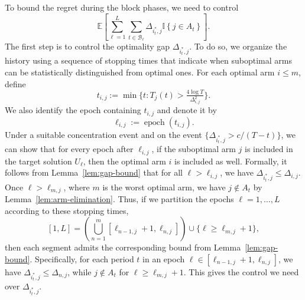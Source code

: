 \documentclass[opre,blindrev]{informs3}
\newcommand{\epoch}{\operatorname{epoch}}
\newcommand{\ind}[1]{\mathbb{I}\left\{#1\right\}}
\newcommand{\bE}[1]{{\mathbb{E}\left[#1\right]}}
\begin{document}
\begin{APPENDICES}
To bound the regret during the block phases, we need to control
\[
    \bE{\sum_{\ell=1}^L \sum_{t\in \mathcal{B}_{\ell}} \Delta_{i_t^*,j} \ind{j\in A_t}}.
\]
The first step is to control the optimality gap \(\Delta_{i_t^*,j}\). To do so, we organize the history using a sequence of stopping times that indicate when suboptimal arms can be statistically distinguished from optimal ones. For each optimal arm \(i \leq m\), define
\begin{equation}\label{eq:main-tij}
    t_{i,j}:=\min\Big\{t: T_j(t)>\tfrac{4\log T}{\Delta_{i,j}^2}\Big\}.
\end{equation}
We also identify the epoch containing \(t_{i,j}\) and denote it by
\[
    \ell_{i,j}:=\epoch(t_{i,j}).
\]
Under a suitable concentration event and on the event \(\{\Delta_{i_t^*,j}> c/(T-t)\}\), we can show that for every epoch after \(\ell_{i,j}\), if the suboptimal arm \(j\) is included in the target solution \(U_\ell\), then the optimal arm \(i\) is included as well. Formally, it follows from Lemma~\ref{lem:gap-bound} that for all \(\ell>\ell_{i,j}\), we have \(\Delta_{i_t^*,j} \le \Delta_{i,j}\). Once \(\ell>\ell_{m,j}\), where \(m\) is the worst optimal arm, we have \(j\notin A_t\) by Lemma~\ref{lem:arm-elimination}. Thus, if we partition the epochs \(\ell=1,\dots,L\) according to these stopping times,
\[
    [1,L]=\left(\bigcup_{n=1}^m [\ell_{n-1,j}+1, \ell_{n,j}]\right)\cup \big\{\ell\geq \ell_{m,j}+1\big\},
\]
then each segment admits the corresponding bound from Lemma~\ref{lem:gap-bound}. Specifically, for each period \(t\) in an epoch \(\ell \in [\ell_{n-1,j}+1, \ell_{n,j}]\), we have \(\Delta_{i_t^*,j} \le \Delta_{n,j}\), while \(j\notin A_t\) for \(\ell\geq \ell_{m,j}+1\). This gives the control we need over \(\Delta_{i_t^*,j}\).

\begin{figure}[t]
    \centering
\end{figure}
\end{APPENDICES}
\end{document}
